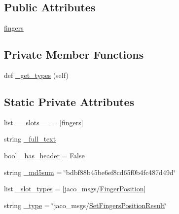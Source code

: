 \subsection*{Public Attributes}
\begin{DoxyCompactItemize}
\item 
\hyperlink{classjaco__msgs_1_1msg_1_1__SetFingersPositionResult_1_1SetFingersPositionResult_a8476169c7617c124b3cb2cfd45e11288}{fingers}
\end{DoxyCompactItemize}
\subsection*{Private Member Functions}
\begin{DoxyCompactItemize}
\item 
def \hyperlink{classjaco__msgs_1_1msg_1_1__SetFingersPositionResult_1_1SetFingersPositionResult_a9bb71d8bfc3d5aa30410557be1e59341}{\+\_\+get\+\_\+types} (self)
\end{DoxyCompactItemize}
\subsection*{Static Private Attributes}
\begin{DoxyCompactItemize}
\item 
list \hyperlink{classjaco__msgs_1_1msg_1_1__SetFingersPositionResult_1_1SetFingersPositionResult_a409661eac9d683d7e8b46d4044376b1d}{\+\_\+\+\_\+slots\+\_\+\+\_\+} = \mbox{[}\textquotesingle{}\hyperlink{classjaco__msgs_1_1msg_1_1__SetFingersPositionResult_1_1SetFingersPositionResult_a8476169c7617c124b3cb2cfd45e11288}{fingers}\textquotesingle{}\mbox{]}
\item 
string \hyperlink{classjaco__msgs_1_1msg_1_1__SetFingersPositionResult_1_1SetFingersPositionResult_a20a964a0a00cb9db82ca39e79b7a1416}{\+\_\+full\+\_\+text}
\item 
bool \hyperlink{classjaco__msgs_1_1msg_1_1__SetFingersPositionResult_1_1SetFingersPositionResult_a7439ece6f7c49c269dc5c601eb6b2014}{\+\_\+has\+\_\+header} = False
\item 
string \hyperlink{classjaco__msgs_1_1msg_1_1__SetFingersPositionResult_1_1SetFingersPositionResult_a709896de69695249b718d54b421693b7}{\+\_\+md5sum} = \char`\"{}bdbf88b45be6ef8cd65f0b4fc487d49d\char`\"{}
\item 
list \hyperlink{classjaco__msgs_1_1msg_1_1__SetFingersPositionResult_1_1SetFingersPositionResult_a5698852e247423ac3a2027df91504183}{\+\_\+slot\+\_\+types} = \mbox{[}\textquotesingle{}jaco\+\_\+msgs/\hyperlink{classjaco__msgs_1_1msg_1_1__FingerPosition_1_1FingerPosition}{Finger\+Position}\textquotesingle{}\mbox{]}
\item 
string \hyperlink{classjaco__msgs_1_1msg_1_1__SetFingersPositionResult_1_1SetFingersPositionResult_ae00c6e987fb8b8bad4b6d1056c704126}{\+\_\+type} = \char`\"{}jaco\+\_\+msgs/\hyperlink{classjaco__msgs_1_1msg_1_1__SetFingersPositionResult_1_1SetFingersPositionResult}{Set\+Fingers\+Position\+Result}\char`\"{}
\end{DoxyCompactItemize}


